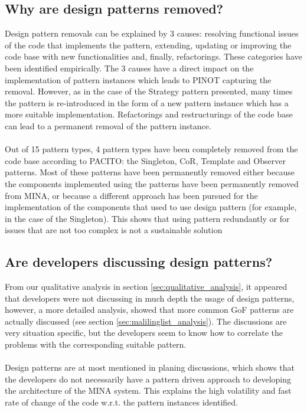 \subsection{Why are design patterns removed?}
Design pattern removals can be explained by 3 causes: resolving functional issues of the code that implements the pattern, extending, updating or improving the code base with new functionalities and, finally, refactorings. These categories have been identified empirically. The 3 causes have a direct impact on the implementation of pattern instances which leads to PINOT capturing the removal. However, as in the case of the Strategy pattern presented, many times the pattern is re-introduced in the form of a new pattern instance which has a more suitable implementation. Refactorings and restructurings of the code base can lead to a permanent removal of the pattern instance.\\\\
Out of 15 pattern types, 4 pattern types have been completely removed from the code base according to PACITO: the Singleton, CoR, Template and Observer patterns. Most of these patterns have been permanently removed either because the components implemented using the patterns have been permanently removed from MINA, or because a different approach has been pursued for the implementation of the components that used to use design pattern (for example, in the case of the Singleton). This shows that using pattern redundantly or for issues that are not too complex is not a sustainable solution  

\subsection{Are developers discussing design patterns?}
From our qualitative analysis in section \ref{sec:qualitative_analysis}, it appeared that developers were not discussing in much depth the usage of design patterns, however, a more detailed analysis, showed that more common GoF patterns are actually discussed (see section \ref{sec:malilinglist_analysis}). The discussions are very situation specific, but the developers seem to know how to correlate the problems with the corresponding suitable pattern.\\\\
Design patterns are at most mentioned in planing  discussions, which shows that the developers do not necessarily have a pattern driven approach to developing the architecture of the MINA system. This explains the high volatility and fast rate of change of the code w.r.t. the pattern instances identified.

